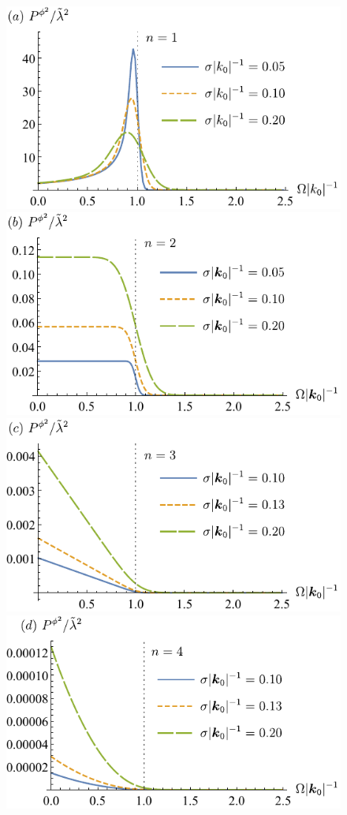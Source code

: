 \documentclass[11pt,prd,onecolumn,superscriptaddress,nofootinbib,floatfix,amsmath,amssymb]{revtex4-2}
\begin{document}
    
    	
    \begin{figure}[htp]
        \includegraphics[scale=0.8]{Fig3a.pdf}
        \includegraphics[scale=0.8]{Fig3b.pdf}
        \includegraphics[scale=0.8]{Fig3c.pdf}
        \includegraphics[scale=0.8]{Fig3d.pdf}

\end{figure}
\end{document}

